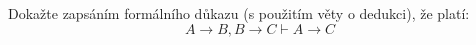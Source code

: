 Dokažte zapsáním formálního důkazu (s použitím věty o dedukci), že platí:
$$A\rightarrow B, B\rightarrow C \vdash A\rightarrow C$$
